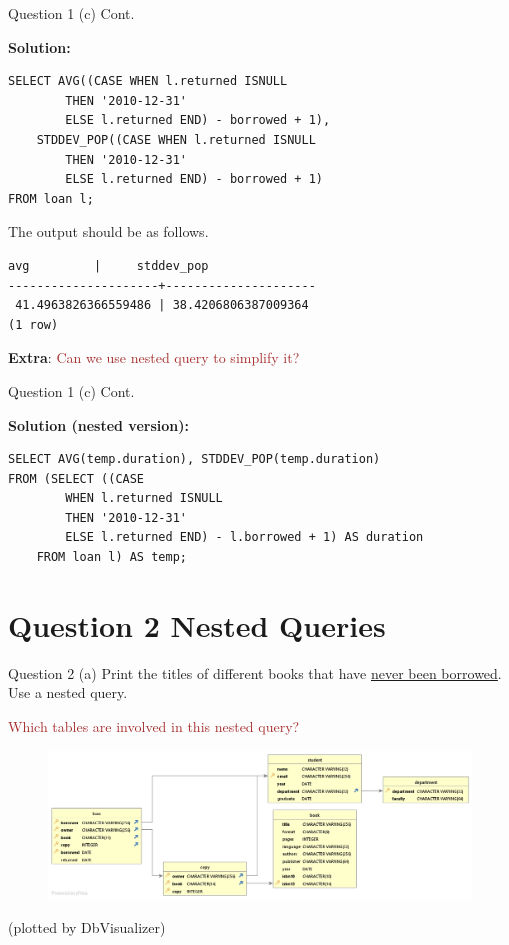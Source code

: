 \begin{frame}[fragile]{Question 1 (c) Cont.}
	
\textbf{Solution:}

\begin{lstlisting}
SELECT AVG((CASE WHEN l.returned ISNULL 
		THEN '2010-12-31'
		ELSE l.returned END) - borrowed + 1),
	STDDEV_POP((CASE WHEN l.returned ISNULL 
		THEN '2010-12-31'
		ELSE l.returned END) - borrowed + 1)
FROM loan l;
\end{lstlisting}
\vspace{5pt}
The output should be as follows.
\begin{lstlisting}[style=terminial]	
         avg         |     stddev_pop
---------------------+---------------------
 41.4963826366559486 | 38.4206806387009364
(1 row)	
\end{lstlisting}
\vspace{5pt}
\textbf{Extra}: \textcolor{brown}{Can we use nested query to simplify it?}
\end{frame}


\begin{frame}[fragile]{Question 1 (c) Cont.}
	
\textbf{Solution (nested version):}
\begin{lstlisting}
SELECT AVG(temp.duration), STDDEV_POP(temp.duration)
FROM (SELECT ((CASE
		WHEN l.returned ISNULL 
		THEN '2010-12-31'
		ELSE l.returned END) - l.borrowed + 1) AS duration 
	FROM loan l) AS temp;
\end{lstlisting}
\end{frame}

\section*{Question 2 Nested Queries}

\begin{frame}[fragile]{Question 2 (a)}
Print the titles of different books that have \underline{never been borrowed}. Use a nested query.\\ \vspace{5pt}

\textcolor{brown}{Which tables are involved in this nested query?}
\begin{figure}
	\includegraphics[width=1\textwidth]{t1/images/t1-end.png}
\end{figure}\vspace{-10pt}
{\tiny(plotted by DbVisualizer)}
\end{frame}

